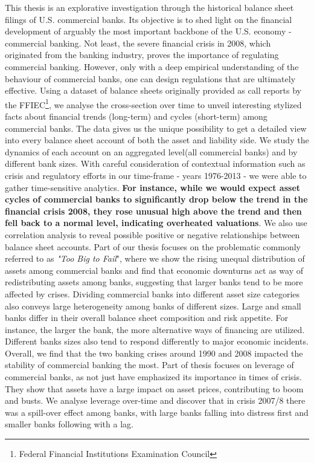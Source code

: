 \documentclass[12pt, a4paper]{article} %
\begin{document}
This thesis is an explorative investigation through the historical balance sheet filings of U.S. commercial banks. Its objective is to shed light on the financial development of arguably the most important backbone of the U.S. economy - commercial banking. Not least, the severe financial crisis in 2008, which originated from the banking industry, proves the importance of regulating commercial banking. However, only with a deep empirical understanding of the behaviour of commercial banks, one can design regulations that are ultimately effective. Using a dataset of balance sheets originally provided as call reports by the FFIEC\footnote{Federal Financial Institutions Examination Council}, we analyse the cross-section over time to unveil interesting stylized facts about financial trends (long-term) and cycles (short-term) among commercial banks. The data gives us the unique possibility to get a detailed view into every balance sheet account of both the asset and liability side. We study the dynamics of each account on an aggregated level(all commercial banks) and by different bank sizes. With careful consideration of contextual information such as crisis and regulatory efforts in our time-frame - years 1976-2013 - we were able to gather time-sensitive analytics. \textbf{For instance, while we would expect asset cycles of commercial banks to significantly drop below the trend in the financial crisis 2008, they rose unusual high above the trend and then fell back to a normal level, indicating overheated valuations}. We also use correlation analysis to reveal possible positive or negative relationships between balance sheet accounts. Part of our thesis focuses on the problematic commonly referred to as \textit{"Too Big to Fail}", where we show the rising unequal distribution of assets among commercial banks and find that economic downturns act as way of redistributing assets among banks, suggesting that larger banks tend to be more affected by crises. 
Dividing commercial banks into different asset size categories also conveys large heterogeneity among banks of different sizes. 
Large and small banks differ in their overall balance sheet composition and risk appetite. For instance, the larger the bank, the more alternative ways of financing are utilized. Different banks sizes also tend to respond differently to major economic incidents. Overall, we find that
the two banking crises around 1990 and 2008 impacted the stability of commercial banking the most. Part of thesis focuses on leverage of commercial banks, as not just \citet{geanakoplos2010leverage} have emphasized its importance in times of crisis. They show that assets have a large impact on asset prices, contributing to boom and busts. We analyse leverage over-time and discover that in crisis 2007/8 there was a spill-over effect among banks, with large banks falling into distress first and smaller banks following with a lag.
\end{document}
